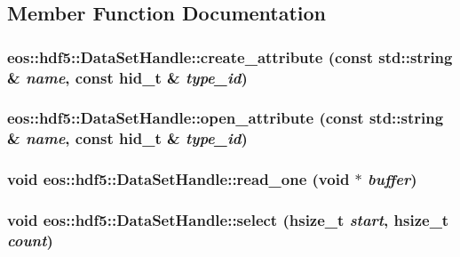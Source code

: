 \subsection{Member Function Documentation}
\hypertarget{classeos_1_1hdf5_1_1DataSetHandle_a084cff6f4549ab930d0d2cff8ff5ac6b}{
\subsubsection[{create\_\-attribute}]{ eos::hdf5::DataSetHandle::create\_\-attribute (const std::string \& {\em name}, \/  const {\bf hid\_\-t} \& {\em type\_\-id})}}
\label{classeos_1_1hdf5_1_1DataSetHandle_a084cff6f4549ab930d0d2cff8ff5ac6b}
\hypertarget{classeos_1_1hdf5_1_1DataSetHandle_a874dee8bc477055ee76955e78c00a09e}{
\subsubsection[{open\_\-attribute}]{ eos::hdf5::DataSetHandle::open\_\-attribute (const std::string \& {\em name}, \/  const {\bf hid\_\-t} \& {\em type\_\-id})}}
\label{classeos_1_1hdf5_1_1DataSetHandle_a874dee8bc477055ee76955e78c00a09e}
\hypertarget{classeos_1_1hdf5_1_1DataSetHandle_a099c9af4e4d27b956bde64118ef064c9}{
\subsubsection[{read\_\-one}]{\setlength{\rightskip}{0pt plus 5cm}void eos::hdf5::DataSetHandle::read\_\-one (void $\ast$ {\em buffer})}}
\label{classeos_1_1hdf5_1_1DataSetHandle_a099c9af4e4d27b956bde64118ef064c9}
\hypertarget{classeos_1_1hdf5_1_1DataSetHandle_ad41a15bd7f720870427ef14742a2a6cf}{
\subsubsection[{select}]{\setlength{\rightskip}{0pt plus 5cm}void eos::hdf5::DataSetHandle::select (hsize\_\-t {\em start}, \/  hsize\_\-t {\em count})}}
